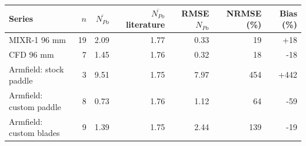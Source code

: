 \begin{tabular}{@{}lrrrrrr@{}}
\toprule
Series & $n$ & $\overline{N_{Po}}$ & $\overline{N_{Po}}$ literature & RMSE $N_{Po}$ & NRMSE (\%) & Bias (\%) \\
\midrule
MIXR-1 96 mm & 19 & 2.09 & 1.77 & 0.33 & 19 & +18 \\
CFD 96 mm & 7 & 1.45 & 1.76 & 0.32 & 18 & -18 \\
Armfield: stock paddle & 3 & 9.51 & 1.75 & 7.97 & 454 & +442 \\
Armfield: custom paddle & 8 & 0.73 & 1.76 & 1.12 & 64 & -59 \\
Armfield: custom blades & 9 & 1.39 & 1.75 & 2.44 & 139 & -19 \\
\bottomrule
\end{tabular}
